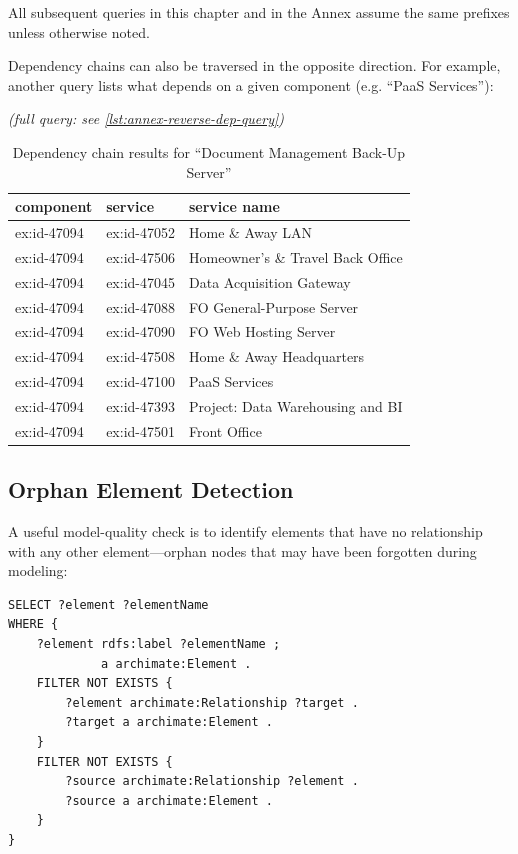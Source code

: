 All subsequent queries in this chapter and in the Annex assume the same prefixes unless otherwise noted.

Dependency chains can also be traversed in the opposite direction. For example, another query lists what depends on a given component (e.g. ``PaaS Services''):

\textit{(full query: see \autoref{lst:annex-reverse-dep-query})}

\begin{table}[H]
\centering
\caption{Dependency chain results for ``Document Management Back-Up Server''}
\label{tab:dependency-results}
\small
\begin{tabularx}{\linewidth}{l l X}
\toprule
\textbf{component} & \textbf{service} & \textbf{service name} \\
\midrule
ex:id-47094 & ex:id-47052 & Home \& Away LAN \\
ex:id-47094 & ex:id-47506 & Homeowner's \& Travel Back Office \\
ex:id-47094 & ex:id-47045 & Data Acquisition Gateway \\
ex:id-47094 & ex:id-47088 & FO General-Purpose Server \\
ex:id-47094 & ex:id-47090 & FO Web Hosting Server \\
ex:id-47094 & ex:id-47508 & Home \& Away Headquarters \\
ex:id-47094 & ex:id-47100 & PaaS Services \\
ex:id-47094 & ex:id-47393 & Project: Data Warehousing and BI \\
ex:id-47094 & ex:id-47501 & Front Office \\
\bottomrule
\end{tabularx}
\end{table}

\subsection{Orphan Element Detection}
\label{subsec:orphan-elements}

A useful model-quality check is to identify elements that have no relationship with any other element---orphan nodes that may have been forgotten during modeling:

\begin{lstlisting}[caption={Detect orphan elements (no incoming or outgoing relationships)}]
SELECT ?element ?elementName
WHERE {
    ?element rdfs:label ?elementName ;
             a archimate:Element .
    FILTER NOT EXISTS {
        ?element archimate:Relationship ?target .
        ?target a archimate:Element .
    }
    FILTER NOT EXISTS {
        ?source archimate:Relationship ?element .
        ?source a archimate:Element .
    }
}
\end{lstlisting}

